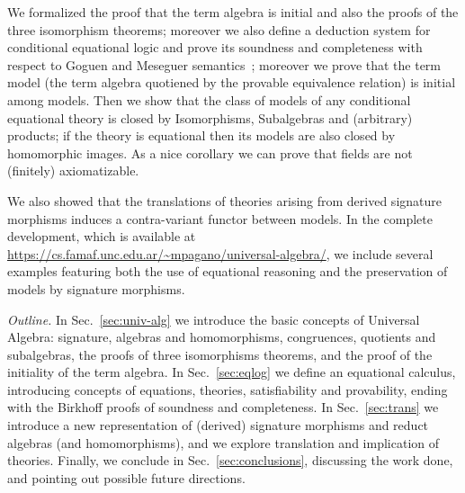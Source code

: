 We formalized the proof that the term algebra is initial and also the
proofs of the three isomorphism theorems; moreover we also define a
deduction system for conditional equational logic and prove its
soundness and completeness with respect to Goguen and Meseguer
semantics~\cite{GoguenM82}; moreover we prove that the term model (the
term algebra quotiened by the provable equivalence relation) is
initial among models. Then we show that the class of models of any
conditional equational theory is closed by Isomorphisms, Subalgebras
and (arbitrary) products; if the theory is equational then its models
are also closed by homomorphic images. As a nice corollary we can
prove that fields are not (finitely) axiomatizable.

We also showed that the translations of theories arising from derived
signature morphisms induces a contra-variant functor between models.
In the complete development, which is available at
\url{https://cs.famaf.unc.edu.ar/~mpagano/universal-algebra/}, we
include several examples featuring both the use of equational
reasoning and the preservation of models by signature morphisms.

\textit{Outline.} In Sec.~\ref{sec:univ-alg} we introduce the basic
concepts of Universal Algebra: signature, algebras and homomorphisms,
congruences, quotients and subalgebras, the proofs of three
isomorphisms theorems, and the proof of the initiality of the term
algebra.  In Sec.~\ref{sec:eqlog} we define an equational calculus, introducing
concepts of equations, theories, satisfiability and provability,
ending with the Birkhoff proofs of soundness and completeness.  In
Sec.~\ref{sec:trans} we introduce a new representation of (derived) signature
morphisms and reduct algebras (and homomorphisms), and we explore
translation and implication of theories.
Finally, we conclude in Sec.~\ref{sec:conclusions}, discussing the
work done, and pointing out possible future directions.
